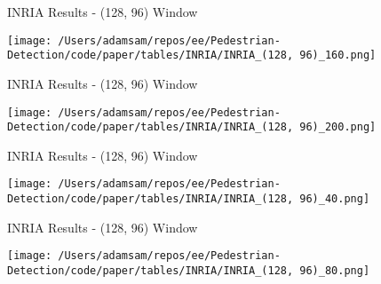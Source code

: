 \begin{table}
    \caption{INRIA Results - (128, 96) Window}
    \texttt{[image: /Users/adamsam/repos/ee/Pedestrian-Detection/code/paper/tables/INRIA/INRIA\_(128, 96)\_160.png]}
    \label{tab:INRIA_(128, 96)_160}
\end{table}

\begin{table}
    \caption{INRIA Results - (128, 96) Window}
    \texttt{[image: /Users/adamsam/repos/ee/Pedestrian-Detection/code/paper/tables/INRIA/INRIA\_(128, 96)\_200.png]}
    \label{tab:INRIA_(128, 96)_200}
\end{table}

\begin{table}
    \caption{INRIA Results - (128, 96) Window}
    \texttt{[image: /Users/adamsam/repos/ee/Pedestrian-Detection/code/paper/tables/INRIA/INRIA\_(128, 96)\_40.png]}
    \label{tab:INRIA_(128, 96)_40}
\end{table}

\begin{table}
    \caption{INRIA Results - (128, 96) Window}
    \texttt{[image: /Users/adamsam/repos/ee/Pedestrian-Detection/code/paper/tables/INRIA/INRIA\_(128, 96)\_80.png]}
    \label{tab:INRIA_(128, 96)_80}
\end{table}

